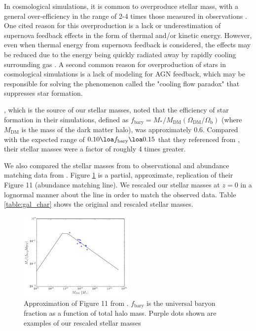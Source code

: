 \documentclass[fleqn,usenatbib,useAMS]{mnras}
\begin{document}
In cosmological simulations, it is common to overproduce stellar mass, with a general over-efficiency in the range of 2-4 times those measured in observations \citep{1996ApJS..105...19K, 2010MNRAS.404.1111G, 2010ApJ...725.2312O}.  One cited reason for this overproduction is a lack or underestimation of supernova feedback effects in the form of thermal and/or kinetic energy.  However, even when thermal energy from supernova feedback is considered, the effects may be reduced due to the energy being quickly radiated away by rapidly cooling surrounding gas \citep{1996ApJS..105...19K}.  A second common reason for overproduction of stars in cosmological simulations is a lack of modeling for AGN feedback, which may be responsible for solving the phenomenon called the "cooling flow paradox" \citep{2001MNRAS.321L..20F} that suppresses star formation. 

\citet{2012MNRAS.425..641L}, which is the source of our stellar masses, noted that the efficiency of star formation in their simulations, defined as $f_\mathrm{bary}=M_*/M_{\mathrm{DM}}(\Omega_\mathrm{DM}/\Omega_\mathrm{b})$ (where $M_\mathrm{DM}$ is the mass of the dark matter halo), was approximately 0.6.  Compared with the expected range of $0.10 \loa f_\mathrm{bary} \loa 0.15$ that they referenced from \citet{2012ApJ...746...95L}, their stellar masses were a factor of roughly 4 times greater.

We also compared the stellar masses from \citet{2012MNRAS.425..641L} to  observational and abundance matching data from \citet{2018AstL...44....8K}. Figure \ref{fig:stellar1} is a partial, approximate, replication of their Figure 11 (abundance matching line).  We rescaled our stellar masses at $z=0$ in a lognormal manner about the line in order to match the observed data.  Table \ref{table:gal_char} shows the original and rescaled stellar masses.

\begin{figure}
\includegraphics[width=0.5\textwidth]{plots/stellar_to_halo_ratio.png}
\caption{Approximation of Figure 11 from \citet{2018AstL...44....8K}.  $f_\mathrm{bary}$ is the universal baryon fraction as a function of total halo mass.  Purple dots shown are examples of our rescaled stellar masses}
\label{fig:stellar1}
\end{figure}
\end{document}
